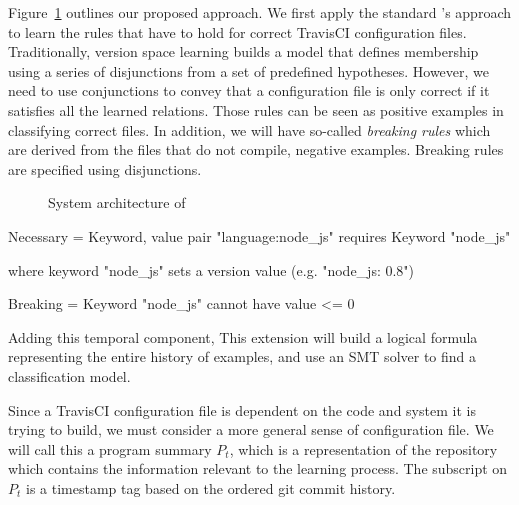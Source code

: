 Figure~\ref{fig:versionSL} outlines our proposed approach. We first apply the standard \app's approach to learn the rules that have 
to hold for correct TravisCI configuration files. Traditionally, 
version space learning builds a model that defines membership using a series of 
disjunctions from a set of predefined hypotheses.  However, we need  to 
use conjunctions to convey that a configuration file is only correct if 
it satisfies all the learned relations. Those rules can be seen as
positive examples in classifying correct files. In addition, we will have
so-called {\emph {breaking rules}} which are derived from the files 
that do not compile, \ie negative examples. Breaking rules are specified 
using disjunctions.


\begin{figure}[!tbh]
  \centering
  \caption{System architecture of }
  \label{fig:versionSL}
\end{figure}


Necessary = 
 { Keyword, value pair "language:node_js" requires Keyword "node_js"}

where keyword "node_js" sets a version value (e.g. "node_js: 0.8")

Breaking =
  { Keyword "node_js" cannot have value <= 0 }


 Adding this temporal component, 
This extension will build a logical formula representing the entire 
history of examples, and use an SMT solver to find a classification model.

Since a TravisCI configuration file is dependent
on the code and system it is trying to build, 
we must consider a more general sense of configuration file.
We will call this a program summary $P_t$, which is a representation 
of the repository which contains the information 
relevant to the learning process.
The subscript on $P_t$ is a timestamp tag based on 
the ordered git commit history.


